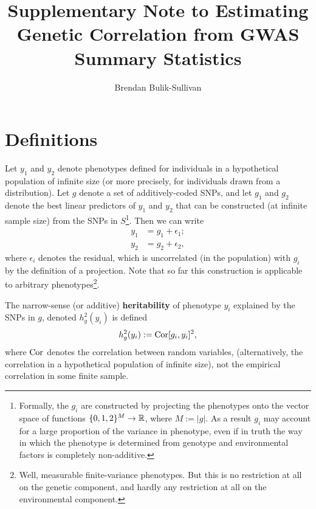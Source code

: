 \documentclass[11pt]{article}
\title{Supplementary Note to Estimating Genetic Correlation from GWAS Summary Statistics}
\author{Brendan Bulik-Sullivan}
\numberwithin{equation}{section}
\numberwithin{definition}{section}
\numberwithin{thm}{section}
\numberwithin{lemma}{section}
\numberwithin{prop}{section}
\numberwithin{cor}{section}
\numberwithin{hyp}{section}
\begin{document}
\maketitle
\tableofcontents
\newpage


\section{Definitions}
\label{Definitions}
Let $y_1$ and $y_2$ denote phenotypes defined for individuals in a hypothetical population of infinite size 
(or more precisely, for individuals drawn from a distribution). 
Let $g$ denote a set of additively-coded SNPs, 
and let $g_1$ and $g_2$ denote the best linear predictors of $y_1$ and $y_2$ that can be constructed (at infinite sample size) from the SNPs in $S$\footnote
{Formally, the $g_i$ are constructed by projecting the phenotypes onto the vector space of functions $\{0,1,2\}^M\to\mathbb{R}$, where $M:=|g|.$
As a result $g_i$ may account for a large proportion of the variance in phenotype, 
even if in truth the way in which the phenotype is determined from genotype and environmental factors is completely non-additive.}.
Then we can write
\begin{align*}
	y_1 &= g_1 + \epsilon_1;\\
	y_2 &= g_2 + \epsilon_2,
\end{align*}
where $\epsilon_i$ denotes the residual, which is uncorrelated (in the population) with $g_i$ by the definition of a projection.
Note that so far this construction is applicable to arbitrary phenotypes\footnote{
Well, measurable finite-variance phenotypes. 
But this is no restriction at all on the genetic component, and hardly any restriction at all on the environmental component.}.

\begin{definition}\label{h2}
The narrow-sense (or additive) \textbf{heritability} of phenotype $y_i$ explained by the SNPs in $g$, 
denoted $h^2_g(y_i)$ is defined
\begin{equation}
h^2_g(y_i) := \mathrm{Cor}[g_i,y_i]^2,
\end{equation}
\noindent
where $\mathrm{Cor}$ denotes the correlation between random variables,
(alternatively, the correlation in a hypothetical population of infinite size),
not the empirical correlation in some finite sample.
\end{definition}
\end{document}
